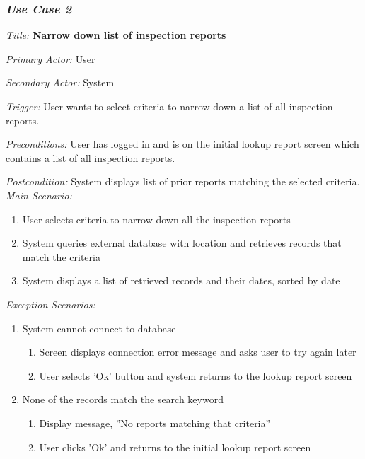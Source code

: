 \documentclass[twoside,letterpaper]{article}
\begin{document}
\subsubsection{\textit{Use Case 2}}

\textit{Title: }{\bfseries\color{black}Narrow down list of inspection reports}

{\color{black} \textit{Primary Actor:} User}

{\color{black} \textit{Secondary Actor:} System}

{\color{black} \textit{Trigger:} User wants to select criteria to narrow down a list of all inspection reports.}

{\color{black} \textit{Preconditions:} User has logged in and is on the initial lookup report screen which contains a list of all inspection reports.}

{\color{black} \textit{Postcondition:} System displays list of prior reports matching the selected criteria.}
\newline
{\color{black} \textit{Main Scenario:}}\
\begin{enumerate}
\item User selects criteria to narrow down all the inspection reports
\item System queries external database with location and retrieves records that match the criteria
\item System displays a list of retrieved records and their dates, sorted by date
\end{enumerate}
{\color{black} \textit{Exception Scenarios:}}
\begin{enumerate}
\item System cannot connect to database
\begin{enumerate}
\item Screen displays connection error message and asks user to try again later
\item User selects 'Ok' button and system returns to the lookup report screen
\end{enumerate}

\item None of the records match the search keyword
\begin{enumerate}
\item Display message, ''No reports matching that criteria''
\item User clicks 'Ok' and returns to the initial lookup report screen
\end{enumerate}
\end{enumerate}
\end{document}
